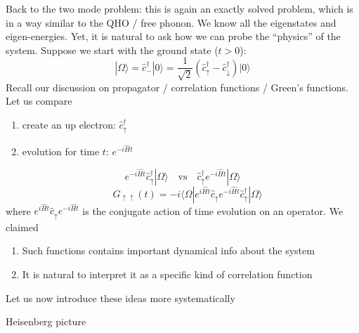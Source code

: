 Back to the two mode problem: this is again an exactly solved problem, which is in a way similar to the QHO / free phonon. We know all the eigenstates and eigen-energies. Yet, it is natural to ask how we can probe the ``physics'' of the system. Suppose we start with the ground state ($t>0$):
\[ |\Omega \rangle =\hat{c}_{-}^{\dagger}|0\rangle =\frac{1}{\sqrt{2}}\left( \hat{c}_{\uparrow}^{\dagger}-\hat{c}_{\downarrow}^{\dagger} \right) |0\rangle \]
Recall our discussion on propagator / correlation functions / Green's functions. Let us compare
\begin{enumerate}
    \item create an up electron: $\hat{c}_\uparrow^\dagger$
    \item evolution for time $t$: $e^{-i\hat{H}t}$
\end{enumerate}
\[ e^{-i\hat{H}t}\hat{c}_{\uparrow}^{\dagger}|\Omega \rangle \quad \mathrm{vs}\quad \hat{c}_{\uparrow}^{\dagger}e^{-i\hat{H}t}|\Omega \rangle \]
\[ \quad G_{\uparrow \uparrow}\left( t \right) =-i\langle \Omega |e^{i\hat{H}t}\hat{c}_{\uparrow}e^{-i\hat{H}t}\hat{c}_{\uparrow}^{\dagger}|\Omega \rangle \]
where $e^{i\hat{H}t}\hat{c}_{\uparrow}e^{-i\hat{H}t}$ is the conjugate action of time evolution on an operator. We claimed
\begin{enumerate}
    \item Such functions contains important dynamical info about the system
    \item It is natural to interpret it as a specific kind of correlation function
\end{enumerate}
Let us now introduce these ideas more systematically

Heisenberg picture

